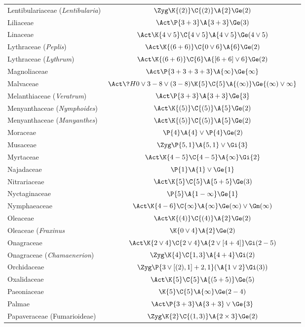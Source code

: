 ﻿\documentclass[12pt]{article}
\begin{document}
\begin{longtable}{lc}
Lentibulariaceae (\textit{Lentibularia}) & $\Zyg\K{(2)}\C{(2)}\A{2}\Ge(2)$\\[2pt]
Liliaceae & $\Act\P{3+3}\A{3+3}\Ge(3)$\\[2pt]
Linaceae & $\Act\K{4\vee5}\C{4\vee5}\A{4\vee5}\Ge(4\vee5)$\\[2pt]
Lythraceae (\textit{Peplis}) & $\Act\K{(6+6)}\C{0\vee6}\A{6}\Ge(2)$\\[2pt]
Lythraceae (\textit{Lythrum}) & $\Act\K{(6+6)}\C{6}\A{[6+6]\vee6}\Ge(2)$\\[2pt]
Magnoliaceae & $\Act\P{3+3+3+3}\A{\infty}\Ge{\infty}$\\[2pt]
Malvaceae & $\Act\?{H}{0\vee3-8\vee(3-8)}\K{5}\C{5}\A{(\infty)}\Ge{(\infty)\vee\infty}$\\[2pt]
Melanthiaceae (\textit{Veratrum}) & $\Act\P{3+3}\A{3+3}\Ge{3}$\\[2pt]
Menyanthaceae (\textit{Nymphoides}) & $\Act\K{(5)}\C{(5)}\A{5}\Ge(2)$\\[2pt]
Menyanthaceae (\textit{Manyanthes}) & $\Act\K{(5)}\C{(5)}\A{5}\Ge(2)$\\[2pt]
Moraceae & $\P{4}\A{4}\vee\P{4}\Ge(2)$\\[2pt]
Musaceae & $\Zyg\P{5,1}\A{5,1}\vee\Gi{3}$\\[2pt]
Myrtaceae & $\Act\K{4-5}\C{4-5}\A{\infty}\Gi{2}$\\[2pt]
Najadaceae & $\P{1}\A{1}\vee\Ge{1}$\\[2pt]
Nitrariaceae & $\Act\K{5}\C{5}\A{5+5}\Ge(3)$\\[2pt]
Nyctaginaceae  & $\P{5}\A{1-\infty}\Ge{1}$\\[2pt]
Nymphaeaceae & $\Act\K{4-6}\C{\infty}\A{\infty}\Ge(\infty)\vee\Gm(\infty)$\\[2pt]
Oleaceae & $\Act\K{(4)}\C{(4)}\A{2}\Ge(2)$\\[2pt]
Oleaceae (\textit{Fraxinus} & $\K{0\vee4}\A{2}\Ge(2)$\\[2pt]
Onagraceae & $\Act\K{2\vee4}\C{2\vee4}\A{2\vee[4+4]}\Gi(2-5)$\\[2pt]
Onagraceae (\textit{Chamaenerion}) & $\Zyg\K{4}\C{1,3}\A{4+4}\Gi(2)$\\[2pt]
Orchidaceae & $\Zyg\P{3\vee[(2),1]+2,1}(\A{1\vee2}\Gi(3))$\\[2pt]
Oxalidaceae & $\Act\K{5}\C{5}\A{(5+5)}\Ge(5)$\\[2pt]
Paeoniaceae & $\K{5}\C{5}\A{\infty}\Ge(2-4)$\\[2pt]
Palmae & $\Act\P{3+3}\A{3+3}\vee\Ge{3}$\\[2pt]
Papaveraceae (Fumarioideae) & $\Zyg\K{2}\C{(1,3)}\A{2\times3}\Ge(2)$\\[2pt]

\end{longtable}
\end{document}
